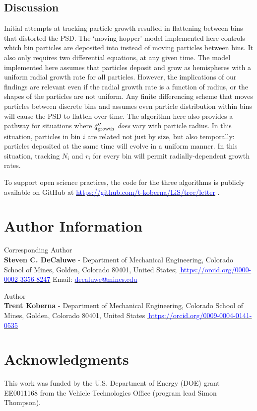 \documentclass[final,3p,times,twocolumn, 12pt]{elsarticle}    %
\newcommand{\bluelink}[2]{%
  \href{#1}{\textcolor{blue}{#2}}%
}
\begin{document}
\subsection{Discussion}
Initial attempts at tracking particle growth resulted in flattening between bins that distorted the PSD. The `moving hopper' model implemented here controls which bin particles are deposited into instead of moving particles between bins. It also only requires two differential equations, at any given time. The model implemented here assumes that particles deposit and grow as hemispheres with a uniform radial growth rate for all particles. However, the implications of our findings are relevant even if the radial growth rate is a function of radius, or the shapes of the particles are not uniform. Any finite differencing scheme that moves particles between discrete bins and assumes even particle distribution within bins will cause the PSD to flatten over time.  The algorithm here also provides a pathway for situations where $\dot{q}^{\prime\prime}_{\rm growth}$ \emph{does} vary with particle radius. In this situation, particles in bin $i$ are related not just by size, but also temporally: particles deposited at the same time will evolve in a uniform manner.  In this situation, tracking $N_i$ and $r_i$ for every bin will permit radially-dependent growth rates.

To support open science practices, the code for the three algorithms is publicly available on GitHub at \bluelink{https://github.com/t-koberna/LiS/tree/letter}{https://github.com/t-koberna/LiS/tree/letter}. \\ 


\section{Author Information}
Corresponding Author \\
\textbf{Steven C. DeCaluwe} - Department of Mechanical Engineering, Colorado School of Mines, Golden, Colorado 80401, United States; \bluelink{https://orcid.org/0000-0002-3356-8247}{\orcidlink{0000-0002-3356-8247}\,https://orcid.org/0000-0002-3356-8247} Email: \bluelink{decaluwe@mines.edu}{decaluwe@mines.edu}

Author\\
\textbf{Trent Koberna} - Department of Mechanical Engineering, Colorado School of Mines, Golden, Colorado 80401, United States \bluelink{https://orcid.org/0009-0004-0141-0535}{\orcidlink{0000-0002-3356-8247}\,https://orcid.org/0009-0004-0141-0535} 
\section{Acknowledgments}
This work was funded by the U.S. Department of Energy (DOE) grant EE0011168 from the Vehicle Technologies Office (program lead Simon Thompson).



\end{document}
